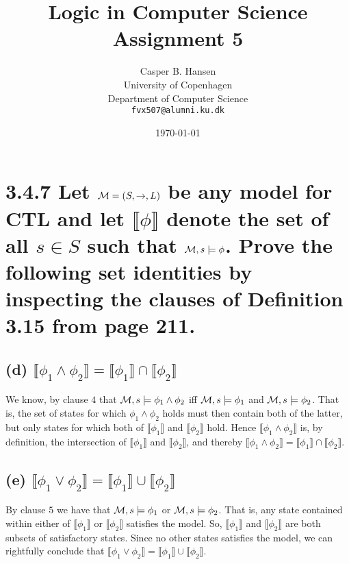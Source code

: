 \documentclass[11pt,a4paper]{article}
\title
{
{\Large Logic in Computer Science}\\
Assignment 5
}
\author
{
	Casper B. Hansen\\
	University of Copenhagen\\
	Department of Computer Science\\
	{\tt fvx507@alumni.ku.dk}
}
\date{\today}
\let\imp\to
\begin{document}
\maketitle

\section*{3.4.7 \mdseries Let ${\cal M} = (S,\imp,L)$ be any model for CTL and
let $\llbracket\phi\rrbracket$ denote the set of all $s \in S$ such that
${\cal M}, s \models \phi$. Prove the following set identities by inspecting
the clauses of Definition 3.15 from page 211.}

\subsection*{(d) \mdseries $\llbracket\phi_1 \land \phi_2\rrbracket =
\llbracket\phi_1\rrbracket\cap\llbracket\phi_2\rrbracket$}
We know, by clause $4$ that ${\cal M}, s \models \phi_1 \land \phi_2$ iff
${\cal M}, s \models \phi_1$ and ${\cal M}, s \models \phi_2$. That is, the
set of states for which $\phi_1 \land \phi_2$ holds must then contain both of
the latter, but only states for which both of $\llbracket\phi_1\rrbracket$ and
$\llbracket\phi_2\rrbracket$ hold. Hence
$\llbracket\phi_1 \land \phi_2\rrbracket$ is, by definition, the intersection
of $\llbracket\phi_1\rrbracket$ and $\llbracket\phi_2\rrbracket$, and thereby
$\llbracket\phi_1 \land \phi_2\rrbracket =
\llbracket\phi_1\rrbracket\cap\llbracket\phi_2\rrbracket$.

\subsection*{(e) \mdseries $\llbracket\phi_1 \lor \phi_2\rrbracket =
\llbracket\phi_1\rrbracket\cup\llbracket\phi_2\rrbracket$}
By clause $5$ we have that ${\cal M}, s \models \phi_1$ or ${\cal M}, s
\models \phi_2$. That is, any state contained within either of
$\llbracket\phi_1\rrbracket$ or $\llbracket\phi_2\rrbracket$ satisfies the
model. So, $\llbracket\phi_1\rrbracket$ and $\llbracket\phi_2\rrbracket$ are
both subsets of satisfactory states. Since no other states satisfies the
model, we can rightfully conclude that $\llbracket\phi_1 \lor \phi_2\rrbracket
= \llbracket\phi_1\rrbracket\cup\llbracket\phi_2\rrbracket$.
\end{document}
